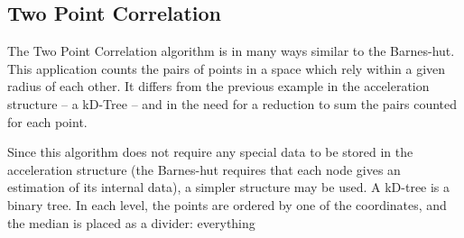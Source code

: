 \subsection{Two Point Correlation}
\label{sec:cases:pointcorr}

The Two Point Correlation algorithm is in many ways similar to the Barnes-hut. This application counts the pairs of points in a space which rely within a given radius of each other. It differs from the previous example in the acceleration structure -- a kD-Tree -- and in the need for a reduction to sum the pairs counted for each point.

Since this algorithm does not require any special data to be stored in the acceleration structure (the Barnes-hut requires that each node gives an estimation of its internal data), a simpler structure may be used. A kD-tree is a binary tree. In each level, the points are ordered by one of the coordinates, and the median is placed as a divider: everything 